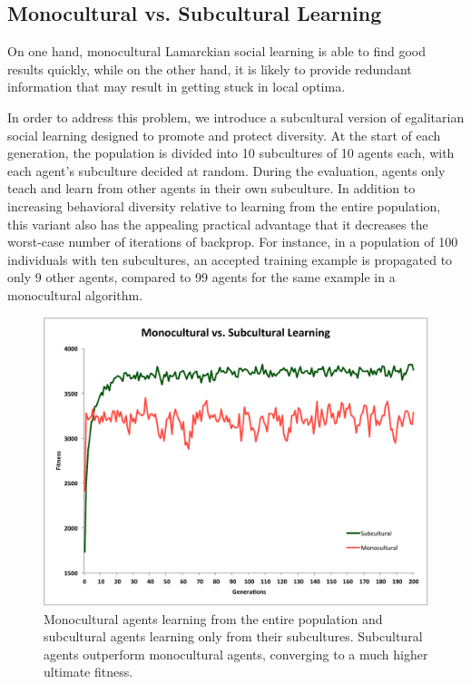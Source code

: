 \documentclass{sig-alternate}
\begin{document}
\subsection*{Monocultural vs. Subcultural Learning}
On one hand, monocultural Lamarckian social learning is able to find good results quickly, while on the other hand, it is likely to provide redundant information that may result in getting stuck in local optima.  

In order to address this problem, we introduce a subcultural version of egalitarian social learning designed to promote and protect diversity. At the start of each generation, the population is divided into 10 subcultures of 10 agents each, with each agent's subculture decided at random. During the evaluation, agents only teach and learn from other agents in their own subculture. In addition to increasing behavioral diversity relative to learning from the entire population, this variant also has the appealing practical advantage that it decreases the worst-case number of iterations of backprop. For instance, in a population of 100 individuals with ten subcultures, an accepted training example is propagated to only 9 other agents, compared to 99 agents for the same example in a monocultural algorithm.

\begin{figure}
  \centering
    \includegraphics[scale=.41]{monocultural_vs_subcultural_learning.pdf}
  \caption{Monocultural agents learning from the entire population and subcultural agents learning only from their subcultures.  Subcultural agents outperform monocultural agents, converging to a much higher ultimate fitness.}
  \label{fig:population-social}
\end{figure}
\end{document}
